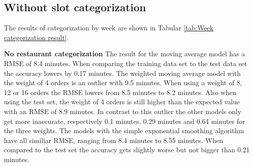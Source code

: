 \subsection{Without slot categorization}
The results of categorization by week are shown in Tabular \ref{tab:Week categorization result}.
\begin{table}[h]
\centering
\caption{Week categorization without slots}
\label{tab:Week categorization result}
\end{table}
\newline\newline\textbf{No restaurant categorization}\newline
The result for the moving average model has a RMSE of 8.4 minutes. When comparing the training data set to the test data set the accuracy lowers by 0.17 minutes. The weighted moving average model with the weight of 4 orders is an outlier with 9.5 minutes. When using a weight of 8, 12 or 16 orders the RMSE lowers from 8.5 minutes to 8.2 minutes. Also when using the test set, the weight of 4 orders is still higher than the expected value with an RMSE of 8.9 minutes. In contrast to this outlier the other models only get more inaccurate, respectively 0.1 minutes, 0.29 minutes and 0.64 minutes for the three weights. The models with the simple exponential smoothing algorithm have all similiar RMSE, ranging from 8.4 minutes to 8.55 minutes. When compared to the test set the accuracy gets slightly worse but not bigger than 0.21 minutes.\newline
